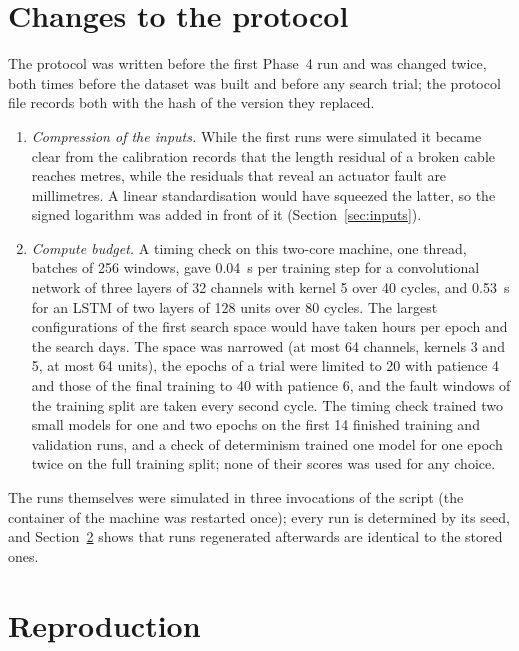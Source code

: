 \documentclass[10pt]{article}
\begin{document}
\section{Changes to the protocol}\label{sec:amend}

The protocol was written before the first Phase~4 run and was changed twice, both times before the dataset was built and before any search trial; the protocol file records both with the hash of the version they replaced.
\begin{enumerate}
\item \emph{Compression of the inputs.} While the first runs were simulated it became clear from the calibration records that the length residual of a broken cable reaches metres, while the residuals that reveal an actuator fault are millimetres. A linear standardisation would have squeezed the latter, so the signed logarithm was added in front of it (Section~\ref{sec:inputs}).
\item \emph{Compute budget.} A timing check on this two-core machine, one thread, batches of 256 windows, gave 0.04~s per training step for a convolutional network of three layers of 32 channels with kernel 5 over 40 cycles, and 0.53~s for an LSTM of two layers of 128 units over 80 cycles. The largest configurations of the first search space would have taken hours per epoch and the search days. The space was narrowed (at most 64 channels, kernels 3 and 5, at most 64 units), the epochs of a trial were limited to 20 with patience 4 and those of the final training to 40 with patience 6, and the fault windows of the training split are taken every second cycle. The timing check trained two small models for one and two epochs on the first 14 finished training and validation runs, and a check of determinism trained one model for one epoch twice on the full training split; none of their scores was used for any choice.
\end{enumerate}
The runs themselves were simulated in three invocations of the script (the container of the machine was restarted once); every run is determined by its seed, and Section~\ref{sec:repro} shows that runs regenerated afterwards are identical to the stored ones.

\section{Reproduction}\label{sec:repro}
\end{document}
